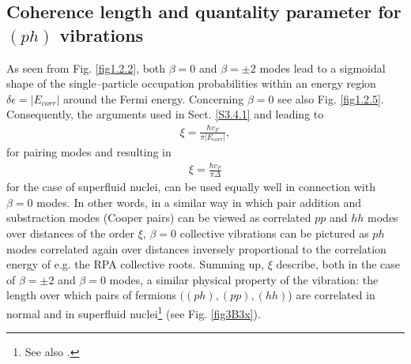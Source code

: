 \begin{subappendices}
 \subsection{Coherence length and quantality parameter for $(ph)$ vibrations}\label{App4.B.2}
As seen from Fig. \ref{fig1.2.2}, both $\beta=0$ and $\beta=\pm2$ modes lead to a sigmoidal shape of the single--particle occupation probabilities within an energy region $\delta\epsilon=|E_{corr}|$ around the Fermi energy. Concerning $\beta=0$ see also Fig. \ref{fig1.2.5}. Consequently, the arguments used in Sect. \ref{S3.4.1} and leading to 
\begin{align}\label{eq3.B.12}
 \xi=\frac{\hbar v_F}{\pi|E_{corr}|},
 \end{align}
 for pairing modes and resulting in
 \begin{align}
 \xi=\frac{\hbar v_F}{\pi\Delta}
 \end{align} 
 for the case of superfluid nuclei, can be used equally well in connection with $\beta=0$ modes. In other words, in a similar way in which pair addition and substraction modes (Cooper pairs) can be viewed as correlated $pp$ and $hh$ modes over distances of the order $\xi$, $\beta=0$ collective vibrations can be pictured as $ph$ modes correlated again over distances inversely proportional to the correlation energy of e.g. the RPA collective roots. Summing up, $\xi$ describe, both in the case of $\beta=\pm2$ and $\beta=0$ modes, a similar  physical property of the vibration: the  length over which  pairs of fermions $((ph),(pp),(hh)$)  are correlated in normal and in superfluid nuclei\footnote{See also \cite{Barranco:19b}.} (see Fig. \ref{fig3B3x}). 
       \begin{figure}

\end{figure}
\end{subappendices}
